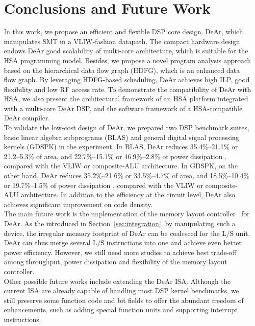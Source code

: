\chapter{Conclusions and Future Work}
In this work, we propose an efficient and flexible DSP core design, DeAr,
which manipulates SMT in a VLIW-fashion datapath.
The compact hardware design endows DeAr good scalability of multi-core architecture, 
which is suitable for the HSA programming model.
Besides, we propose a novel program analysis approach based on the hierarchical data flow graph (HDFG), which is an enhanced data flow graph.
By leveraging HDFG-based scheduling, DeAr achieves high ILP, good flexibility and low RF access rate.
To demonstrate the compatibility of DeAr with HSA,
we also present the architectural framework of an HSA platform integrated with a multi-core DeAr DSP, 
and the software framework of a HSA-compatible DeAr compiler.
\\\indent
To validate the low-cost design of DeAr, we prepared two DSP benchmark suites, basic linear algebra subprograms (BLAS) and general digital signal processing kernels (GDSPK) in the experiment.
In BLAS, DeAr reduces 35.4\%--21.1\% or 21.2--5.3\% of area,
and 22.7\%--15.1\% or 46.9\%--2.8\% of power dissipation , compared with the VLIW or composite-ALU architecture.
In GDSPK, on the other hand, DeAr reduces 35.2\%--21.6\% or 33.5\%--4.7\% of area, 
and 18.5\%--10.4\% or 19.7\%--1.5\% of power dissipation , compared with the VLIW or composite-ALU architecture.
In addition to the efficiency at the circuit level, DeAr also achieves significant improvement on code density.
\\\indent
The main future work is the implementation of the memory layout controller~\cite{sc} for DeAr.
As the introduced in Section~\ref{sec:integration}, by manipulating such a device, the irregular memory footprint of DeAr can be coalesced for the L/S unit.
DeAr can thus merge several L/S instructions into one and achieve even better power efficiency.
However, we still need more studies to achieve best trade-off among throughput, power dissipation and flexibility of the memory layout controller.
\\\indent
Other possible future works include extending the DeAr ISA.
Although the current ISA are already capable of handling most DSP kernel benchmarks, 
we still preserve some function code and bit fields to offer the abundant freedom of enhancements, 
such as adding special function units and supporting interrupt instructions.

